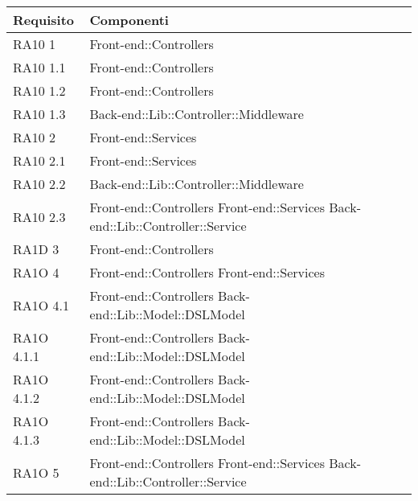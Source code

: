       \begin{center}
      \bgroup
      \def\arraystretch{1.8}
      \begin{longtable}{|p{3cm}|p{7cm}|}
    
      \cellcolor[gray]{0.9} \textbf{Requisito} & \cellcolor[gray]{0.9} \textbf{Componenti}  \\ \hline
      
      RA10 1 & Front-end::Controllers \\ \hline
      RA10 1.1 & Front-end::Controllers \\ \hline
      RA10 1.2 & Front-end::Controllers \\ \hline
      RA10 1.3 & Back-end::Lib::Controller::Middleware \\ \hline
      RA10 2 & Front-end::Services \\ \hline
      RA10 2.1 & Front-end::Services \\ \hline
      RA10 2.2 & Back-end::Lib::Controller::Middleware \\ \hline
      RA10 2.3 & Front-end::Controllers \newline
      			Front-end::Services \newline
      			Back-end::Lib::Controller::Service\\ \hline
      RA1D 3 & Front-end::Controllers \\ \hline
      RA1O 4 & Front-end::Controllers \newline
      			Front-end::Services \\ \hline
      RA1O 4.1 & Front-end::Controllers \newline
      			Back-end::Lib::Model::DSLModel \\ \hline
      RA1O 4.1.1 & Front-end::Controllers \newline
      			Back-end::Lib::Model::DSLModel \\ \newline
      RA1O 4.1.2 & Front-end::Controllers \newline
      			Back-end::Lib::Model::DSLModel \\ \hline
      RA1O 4.1.3 & Front-end::Controllers \newline
      				Back-end::Lib::Model::DSLModel \\ \hline
      RA1O 5 & Front-end::Controllers \newline
      			Front-end::Services \newline
      			Back-end::Lib::Controller::Service\newline

\end{longtable}
\end{center}
